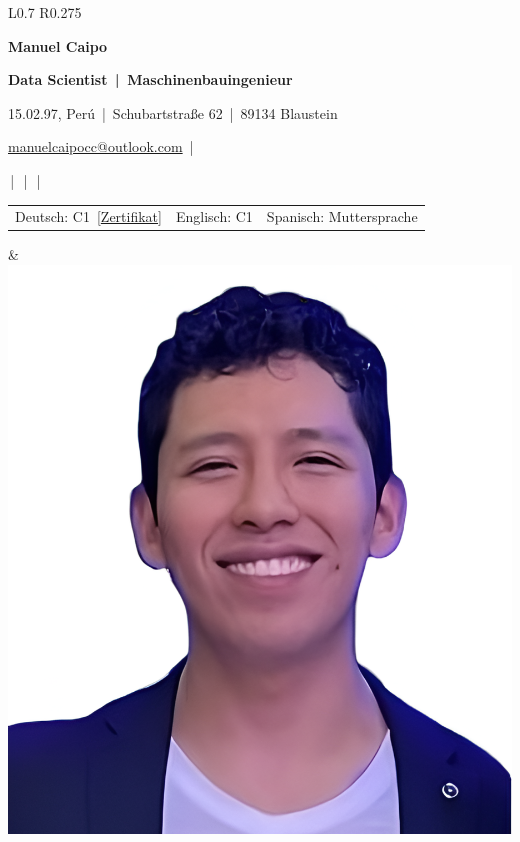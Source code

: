 \setlength{\tabcolsep}{6pt}
\begin{tabular}{L{0.7\linewidth} R{0.275\linewidth}}
  
  \vspace{-8em}
  {\Large\bfseries Manuel Caipo}

  
  \vspace{0.5em}
  \textbf{Data Scientist \,|\, Maschinenbauingenieur}

  \vspace{0.5em}
  \footnotesize
  15.02.97, Perú \,|\, Schubartstraße 62 \,|\, 89134 Blaustein\par
  \href{mailto:manuelcaipocc@outlook.com}{manuelcaipocc@outlook.com} \,|\, \par
  \,|\, 
  \,|\, 
  \,|\, 


\setlength{\tabcolsep}{3pt}
\begin{tabular}{@{}l l l@{}}
Deutsch: C1 \,[\href{https://manuelcaipocc.github.io/cv-caipo-latex/cv_links/german/testdaf-digital-certificate-scale.pdf}{Zertifikat}] &
Englisch: C1 &
Spanisch: Muttersprache
\end{tabular}

&
  \includegraphics[width=0.5\linewidth]{images/manuelcaipo.jpg}
\end{tabular}